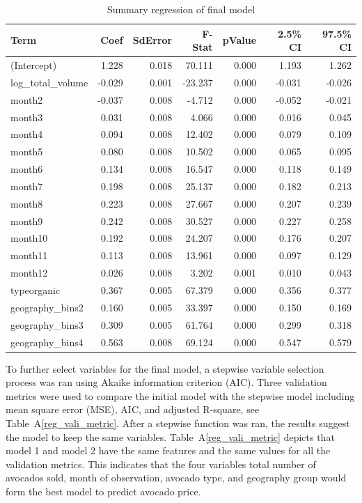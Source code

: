 \documentclass[11pt]{article}\usepackage[]{graphicx}\usepackage[]{color}
\begin{document}
\begin{center}
\begin{table}[ht]
\centering
\begin{tabular}{lrrrrrr}
  \hline
Term & Coef & SdError & F-Stat & pValue & 2.5\% CI & 97.5\% CI \\ 
  \hline
(Intercept) & 1.228 & 0.018 & 70.111 & 0.000 & 1.193 & 1.262 \\ 
  log\_total\_volume & -0.029 & 0.001 & -23.237 & 0.000 & -0.031 & -0.026 \\ 
  month2 & -0.037 & 0.008 & -4.712 & 0.000 & -0.052 & -0.021 \\ 
  month3 & 0.031 & 0.008 & 4.066 & 0.000 & 0.016 & 0.045 \\ 
  month4 & 0.094 & 0.008 & 12.402 & 0.000 & 0.079 & 0.109 \\ 
  month5 & 0.080 & 0.008 & 10.502 & 0.000 & 0.065 & 0.095 \\ 
  month6 & 0.134 & 0.008 & 16.547 & 0.000 & 0.118 & 0.149 \\ 
  month7 & 0.198 & 0.008 & 25.137 & 0.000 & 0.182 & 0.213 \\ 
  month8 & 0.223 & 0.008 & 27.667 & 0.000 & 0.207 & 0.239 \\ 
  month9 & 0.242 & 0.008 & 30.527 & 0.000 & 0.227 & 0.258 \\ 
  month10 & 0.192 & 0.008 & 24.207 & 0.000 & 0.176 & 0.207 \\ 
  month11 & 0.113 & 0.008 & 13.961 & 0.000 & 0.097 & 0.129 \\ 
  month12 & 0.026 & 0.008 & 3.202 & 0.001 & 0.010 & 0.043 \\ 
  typeorganic & 0.367 & 0.005 & 67.379 & 0.000 & 0.356 & 0.377 \\ 
  geography\_bins2 & 0.160 & 0.005 & 33.397 & 0.000 & 0.150 & 0.169 \\ 
  geography\_bins3 & 0.309 & 0.005 & 61.764 & 0.000 & 0.299 & 0.318 \\ 
  geography\_bins4 & 0.563 & 0.008 & 69.124 & 0.000 & 0.547 & 0.579 \\ 
   \hline
\end{tabular}
\caption{Summary regression of final model} 
\label{final_fit}
\end{table}

\end{center}


\noindent To further select variables for the final model, a stepwise variable selection process was ran using Akaike information criterion (AIC). Three validation metrics were used to compare the initial model with the stepwise model including mean square error (MSE), AIC, and adjusted R-square, see Table~A\ref{reg_vali_metric}. After a stepwise function was ran, the results suggest the model to keep the same variables. Table~A\ref{reg_vali_metric} depicts that model 1 and model 2 have the same features and the same values for all the validation metrics. This indicates that the four variables total number of avocados sold, month of observation, avocado type, and geography group would form the best model to predict avocado price.
\hfill \break
\end{document}
